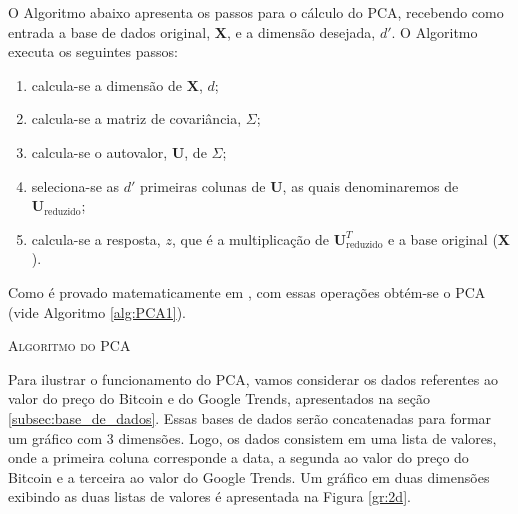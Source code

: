 O Algoritmo abaixo apresenta os passos para o cálculo do PCA, recebendo como entrada a base de dados original, $\mathbf{X}$, e a dimensão desejada, $d'$. O Algoritmo executa os seguintes passos:  
\begin{enumerate}
    \item calcula-se a dimensão de $\mathbf{X}$, $d$;
    \item calcula-se a matriz de covariância, $\Sigma$;
    \item calcula-se o autovalor, $\mathbf{U}$, de $\Sigma$;
    \item seleciona-se as $d'$ primeiras colunas de $\mathbf{U}$, as quais denominaremos de $\mathbf{U}_{\text{reduzido}}$;
    \item calcula-se a resposta, $z$, que é a multiplicação de $\mathbf{U}_{\text{reduzido}}^T$ e a base original ($\mathbf{X}$).
\end{enumerate}

Como é provado matematicamente em \cite{Jolliffe}, com essas operações obtém-se o PCA (vide Algoritmo \ref{alg:PCA1}). 

\begin{center}
 \begin{algorithm}[H]
   \SetAlgoLined
   \label{alg:PCA1}
   \caption{\textsc{Algoritmo do PCA }}
 \end{algorithm}
\end{center}

Para ilustrar o funcionamento do PCA, vamos considerar os dados referentes ao valor do preço do Bitcoin e do Google Trends, apresentados na seção \ref{subsec:base_de_dados}. Essas bases de dados serão concatenadas para formar um gráfico com 3 dimensões. Logo, os dados consistem em uma lista de valores, onde a primeira coluna corresponde a data, a segunda ao valor do preço do Bitcoin e a terceira ao valor do Google Trends. Um gráfico em duas dimensões exibindo as duas listas de valores é apresentada na Figura \ref{gr:2d}. 

